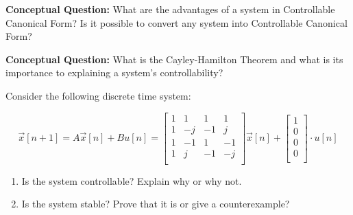 
\begin{enumerate}

\qitem \textbf{Conceptual Question:} What are the advantages of a system in Controllable Canonical Form? Is it possible to convert any system into Controllable Canonical Form?

\qitem \textbf{Conceptual Question:} What is the Cayley-Hamilton Theorem and what is its importance to explaining a system's controllability?




\qitem Consider the following discrete time system:

$$\vec{x}[n+1] = A\vec{x}[n] + Bu[n] = \begin{bmatrix}
1 & 1 & 1 & 1 \\
1 & -j & -1 & j \\
1 & -1 & 1 & -1 \\
1 & j & -1 & -j \\
\end{bmatrix} \vec{x}[n] + \begin{bmatrix}
1 \\
0 \\
0 \\
0 \\
\end{bmatrix} \cdot u[n]
$$

\begin{enumerate}
	\item Is the system controllable? Explain why or why not.
	\item Is the system stable? Prove that it is or give a counterexample?
\end{enumerate}

\end{enumerate}
